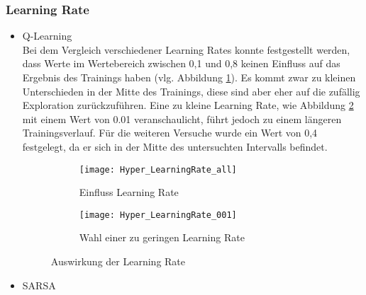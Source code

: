 \subsubsection{Learning Rate}
\begin{itemize}
    \item Q-Learning\\
    Bei dem Vergleich verschiedener Learning Rates konnte festgestellt werden, dass Werte im Wertebereich zwischen 0,1 und 0,8 keinen Einfluss auf das Ergebnis des Trainings haben (vlg. Abbildung \ref{fig:learningRate_all}).
    Es kommt zwar zu kleinen Unterschieden in der Mitte des Trainings, diese sind aber eher auf die zufällig Exploration zurückzuführen.
    Eine zu kleine Learning Rate, wie Abbildung \ref{fig:learningRate_low} mit einem Wert von 0.01 veranschaulicht, führt jedoch zu einem längeren Trainingsverlauf.
    Für die weiteren Versuche wurde ein Wert von 0,4 festgelegt, da er sich in der Mitte des untersuchten Intervalls befindet.

    \begin{figure}[H]
        \centering
        \begin{subfigure}{.5\textwidth}
          \centering
          \texttt{[image: Hyper\_LearningRate\_all]}
          \caption{Einfluss Learning Rate}
          \label{fig:learningRate_all}
        \end{subfigure}%
        \begin{subfigure}{.5\textwidth}
          \centering
          \texttt{[image: Hyper\_LearningRate\_001]}
          \caption{Wahl einer zu geringen Learning Rate}
          \label{fig:learningRate_low}
        \end{subfigure}
        \caption{Auswirkung der Learning Rate}
        \label{fig:learningRate_Q-Learning}
    \end{figure}
    \item SARSA
\end{itemize}
